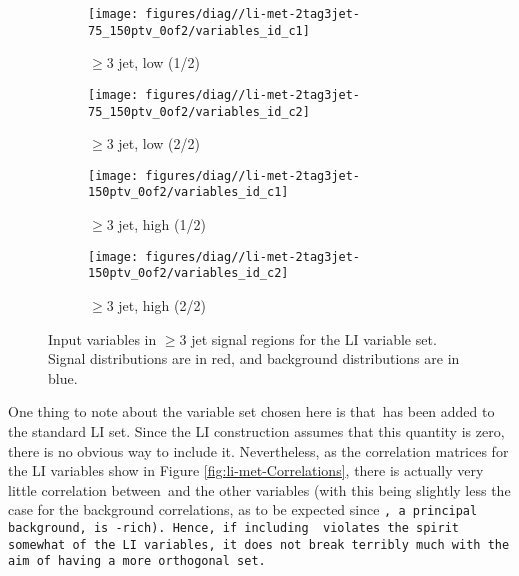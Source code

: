 \begin{figure}[!htbp]\captionsetup{justification=centering}
  \centering
\begin{subfigure}[t]{0.49\textwidth}\centering\texttt{[image: figures/diag//li-met-2tag3jet-75\_150ptv\_0of2/variables\_id\_c1]}\caption{$\ge3$ jet, low \ptv (1/2)}\end{subfigure}
\begin{subfigure}[t]{0.49\textwidth}\centering\texttt{[image: figures/diag//li-met-2tag3jet-75\_150ptv\_0of2/variables\_id\_c2]}\caption{$\ge3$ jet, low \ptv (2/2)}\end{subfigure}
\begin{subfigure}[t]{0.49\textwidth}\centering\texttt{[image: figures/diag//li-met-2tag3jet-150ptv\_0of2/variables\_id\_c1]}\caption{$\ge3$ jet, high \ptv (1/2)}\end{subfigure}
\begin{subfigure}[t]{0.49\textwidth}\centering\texttt{[image: figures/diag//li-met-2tag3jet-150ptv\_0of2/variables\_id\_c2]}\caption{$\ge3$ jet, high \ptv (2/2)}\end{subfigure}
  \caption{Input variables in $\ge3$ jet signal regions for the LI variable set.  Signal distributions are in red, and background distributions are in blue.}
  \label{fig:li-met-inputs3}
\end{figure}
One thing to note about the variable set chosen here is that \met\,has been added to the standard LI set.  Since the LI construction assumes that this quantity is zero, there is no obvious way to include it.  Nevertheless, as the correlation matrices for the LI variables show in Figure \ref{fig:li-met-Correlations}, there is actually very little correlation between \met\,and the other variables (with this being slightly less the case for the background correlations, as to be expected since \tt, a principal background, is \met-rich).  Hence, if including \met\,violates the spirit somewhat of the LI variables, it does not break terribly much with the aim of having a more orthogonal set.
